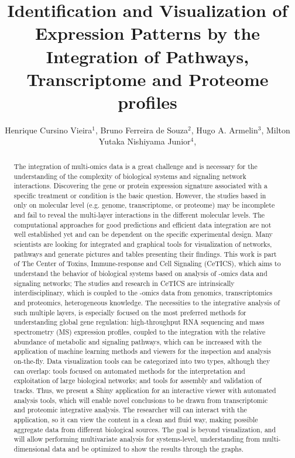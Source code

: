 \documentclass[twoside]{article}
\title{\vspace{-15mm}\fontsize{24pt}{10pt}\selectfont\textbf{ Identification and Visualization of Expression Patterns by the Integration of Pathways, Transcriptome and Proteome profiles }} %
\author{ Henrique Cursino Vieira$^{1}$, Bruno Ferreira de Souza$^{2}$, Hugo A. Armelin$^{3}$, Milton Yutaka Nishiyama Junior$^{4}$, }
\affil{ 1 LECC-CeTICS, Instituto Butantan

2 ECC-CeTICS, Instituto Butantan

3 Instituto Butantan

4 LETA-CeTICS, Instituto Butantan

 }
\date{}
\begin{document}
  
  
  \maketitle %
  
  
  \thispagestyle{fancy} %
  
  
  \begin{abstract}
  The integration of multi-omics data is a great challenge and is necessary for the understanding of the complexity of biological systems and signaling network interactions. Discovering the gene or protein expression signature associated with a specific treatment or condition is the basic question. However, the studies based in only on molecular level (e.g. genome, transcriptome, or proteome) may be incomplete and fail to reveal the multi-layer interactions in the different molecular levels. The computational approaches for good predictions and efficient data integration are not well established yet and can be dependent on the specific experimental design. Many scientists are looking for integrated and graphical tools for visualization of networks, pathways and generate pictures and tables presenting their findings. This work is part of The Center of Toxins, Immune-response and Cell Signaling (CeTICS), which aims to understand the behavior of biological systems based on analysis of -omics data and signaling networks; The studies and research in CeTICS are intrinsically interdisciplinary, which is coupled to the -omics data from genomics, transcriptomics and proteomics, heterogeneous knowledge. 
The necessities to the integrative analysis of such multiple layers, is especially focused on the most preferred methods for understanding global gene regulation: high-throughput RNA sequencing and mass spectrometry (MS) expression profiles, coupled to the integration with the relative abundance of metabolic and signaling pathways, which can be increased with the application of machine learning methods and viewers for the inspection and analysis on-the-fly. Data visualization tools can be categorized into two types, although they can overlap: tools focused on automated methods for the interpretation and exploitation of large biological networks; and tools for assembly and validation of tracks. Thus, we present a Shiny application for an interactive viewer with automated analysis tools, which will enable novel conclusions to be drawn from transcriptomic and proteomic integrative analysis. The researcher will can interact with the application, so it can view the content in a clean and fluid way, making possible aggregate data from different biological sources. The goal is beyond visualization, and will allow performing multivariate analysis for systems-level, understanding from multi-dimensional data and be optimized to show the results through the graphs. 

\end{abstract}
\end{document}
